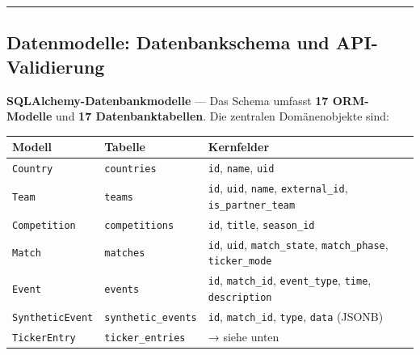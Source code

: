 \begin{center}\rule{0.5\linewidth}{0.5pt}\end{center}

\subsection{Datenmodelle: Datenbankschema und
API-Validierung}\label{datenmodelle-datenbankschema-und-api-validierung}

\textbf{SQLAlchemy-Datenbankmodelle} --- Das Schema umfasst \textbf{17
ORM-Modelle} und \textbf{17 Datenbanktabellen}. Die
zentralen Domänenobjekte sind:

{\def\LTcaptype{none} %
\begin{longtable}[]{@{}
  >{\raggedright\arraybackslash}p{}
  >{\raggedright\arraybackslash}p{}
  >{\raggedright\arraybackslash}p{}@{}}
\toprule\noalign{}
\begin{minipage}[b]{\linewidth}\raggedright
Modell
\end{minipage} & \begin{minipage}[b]{\linewidth}\raggedright
Tabelle
\end{minipage} & \begin{minipage}[b]{\linewidth}\raggedright
Kernfelder
\end{minipage} \\
\midrule\noalign{}
\endhead
\bottomrule\noalign{}
\endlastfoot
\texttt{Country} & \texttt{countries} & \texttt{id}, \texttt{name},
\texttt{uid} \\
\texttt{Team} & \texttt{teams} & \texttt{id}, \texttt{uid},
\texttt{name}, \texttt{external\_id}, \texttt{is\_partner\_team} \\
\texttt{Competition} & \texttt{competitions} & \texttt{id},
\texttt{title}, \texttt{season\_id} \\
\texttt{Match} & \texttt{matches} & \texttt{id}, \texttt{uid},
\texttt{match\_state}, \texttt{match\_phase}, \texttt{ticker\_mode} \\
\texttt{Event} & \texttt{events} & \texttt{id}, \texttt{match\_id},
\texttt{event\_type}, \texttt{time}, \texttt{description} \\
\texttt{SyntheticEvent} & \texttt{synthetic\_events} & \texttt{id},
\texttt{match\_id}, \texttt{type}, \texttt{data} (JSONB) \\
\texttt{TickerEntry} & \texttt{ticker\_entries} & → siehe unten \\

\end{longtable}}
